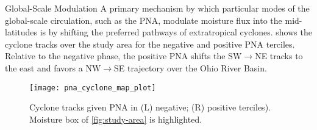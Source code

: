 \begin{block}{Global-Scale Modulation}
    A primary mechanism by which particular modes of the global-scale circulation, such as the PNA, modulate moisture flux into the mid-latitudes is by shifting the preferred pathways of extratropical cyclones.
     shows the cyclone tracks over the study area for the negative and positive PNA terciles.
    Relative to the negative phase, the positive PNA shifts the SW$\rightarrow$NE tracks to the east and favors a NW$\rightarrow$SE trajectory over the Ohio River Basin.
    \begin{figure}
        \texttt{[image: pna\_cyclone\_map\_plot]}
        \caption{Cyclone tracks given PNA in (L) negative; (R) positive terciles). Moisture box of \cref{fig:study-area} is highlighted.}
        \label{fig:track-given-pna}
    \end{figure}
\end{block}
